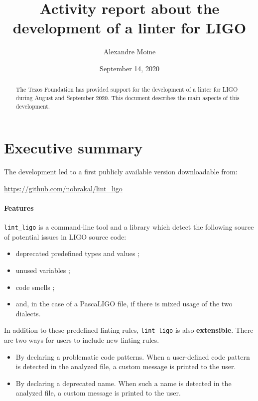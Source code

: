 \documentclass[10pt,a4paper]{article}
\author{Alexandre Moine}
\title{Activity report about the development of a linter for LIGO}
\date{September 14, 2020}
\begin{document}
\maketitle

\begin{abstract}
  The Tezos Foundation has provided support for the
  development of a linter for LIGO during August and September
  2020. This document describes the main aspects of this development.
\end{abstract}

\section{Executive summary}

The development led to a first publicly available version downloadable from:
\begin{center}
  \url{https://github.com/nobrakal/lint\_ligo}
\end{center}


\paragraph{Features}

\verb|lint_ligo| is a command-line tool and a library which detect
the following source of potential issues in LIGO source code:

\begin{itemize}
\item deprecated predefined types and values ;
\item unused variables ;
\item code smells ;
\item and, in the case of a PascaLIGO file, if there is mixed usage of the two dialects.
\end{itemize}

In addition to these predefined linting rules, \verb!lint_ligo! is
also \textbf{extensible}. There are two ways for users to include new
linting rules.

\begin{itemize}
\item
  By declaring a problematic code patterns. When a user-defined code pattern is detected in
  the analyzed file, a custom message is printed to the user.

\item
  By declaring a deprecated name. When such a name is detected
  in the analyzed file, a custom message is printed to the user.
\end{itemize}
\end{document}
